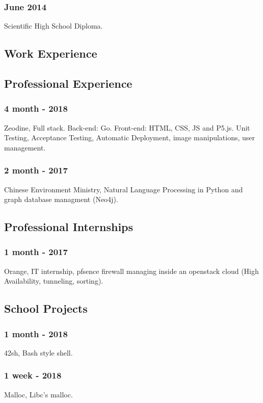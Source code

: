 \documentclass{article}
\begin{document}
        \subsubsection{June 2014}
            Scientific High School Diploma.


    \begin{multicols}{2}
        \section{Work Experience}
            \subsection{Professional Experience}
                \subsubsection{4 month - 2018}
                    Zeodine, Full stack. Back-end: Go. Front-end: HTML, CSS, JS and P5.js.
                    Unit Testing, Acceptance Testing, Automatic Deployment, image manipulations, user management.
                \subsubsection{2 month - 2017}
                    Chinese Environment Ministry, Natural Language Processing in Python and graph database managment (Neo4j).
            \subsection{Professional Internships}
                \subsubsection{1 month - 2017}
                    Orange, IT internship, pfsence firewall managing inside an openstack cloud (High Availability, tunneling, sorting).
            \subsection{School Projects}
                \subsubsection{1 month - 2018}
                    42sh, Bash style shell.
                \subsubsection{1 week - 2018}
                    Malloc, Libc's malloc.

\end{multicols}
\end{document}

